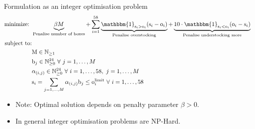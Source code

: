 \begin{frame}{Formulation as an integer optimisation problem}
    \begin{align*}
        \text{minimize: } & \underbrace{\beta M}_{\text{Penalise number of
        boxes}} + \sum_{i = 1}^{58}
        \underbrace{\mathbbm{1}_{\text{s}_i > \text{o}_i} (\text{s}_i -
        \text{o}_i)}_{\text{Penalise overstocking}} +
        \underbrace{
            10 \cdot \mathbbm{1}_{\text{s}_i < \text{o}_i}(\text{o}_i -
            \text{s}_i)}_{\text{Penalise understocking more}}\\
        \text{subject to:}&\\
        &\text{M} \in \N_{\geq 1}\\
        &\text{b}_j \in \N_{\geq 0}^{24}~\forall~j = 1,\dots,M\\
        &\alpha_{(i,j)} \in \N_{\geq 0}^{24}~\forall~i=1,\dots,58,~j=1,\dots,M\\
        &\text{s}_i = \sum_{j = 1,\dots,M}\alpha_{(i,j)}\text{b}_j \leq
        \text{o}_i^{\text{limit}}~\forall~i = 1,\dots,58\\
    \end{align*}
    \begin{itemize}
        \item Note: Optimal solution depends on penalty parameter $\beta > 0$.\\
        \item In general integer optimisation problems are NP-Hard.\\
    \end{itemize}

\end{frame}
